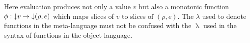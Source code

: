 

Here evaluation produces not only a value $v$ but also a monotonic function $\phi: {\downarrow}{v} \to {\downarrow}{(\rho,e)}$ which maps slices of $v$ to slices of $(\rho,e)$. The $\lambda$ used to denote functions in the meta-language must not be confused with the $\uplambda$ used in the syntax of functions in the object language.


